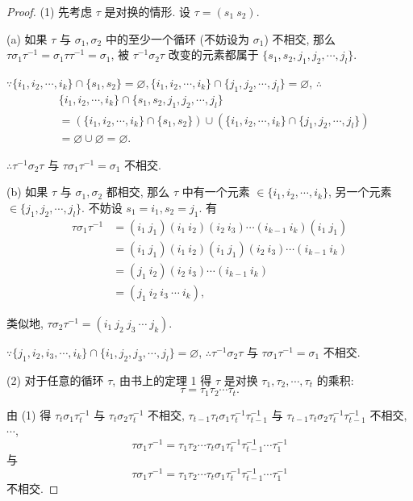 \documentclass[color=black,device=normal,lang=cn,mode=geye]{elegantnote}
\begin{document}
\begin{proof}
    (1) 先考虑 $\tau$ 是对换的情形. 设 $\tau=(s_1\ s_2)$.
    
    (a) 如果 $\tau$ 与 $\sigma_1,\sigma_2$ 中的至少一个循环 (不妨设为 $\sigma_1$) 不相交, 那么 $\tau\sigma_1\tau^{-1}=\sigma_1\tau\tau^{-1}=\sigma_1$, 被 $\tau^{-1}\sigma_2\tau$ 改变的元素都属于 $\{s_1,s_2,j_1,j_2,\cdots,j_l\}$.
    
    $\because\{i_1,i_2,\cdots,i_k\}\cap\{s_1,s_2\}=\varnothing,\{i_1,i_2,\cdots,i_k\}\cap\{j_1,j_2,\cdots,j_l\}=\varnothing$, $\therefore$
    \begin{align*}
        & \{i_1,i_2,\cdots,i_k\}\cap\{s_1,s_2,j_1,j_2,\cdots,j_l\} \\
        & =(\{i_1,i_2,\cdots,i_k\}\cap\{s_1,s_2\})\cup(\{i_1,i_2,\cdots,i_k\}\cap\{j_1,j_2,\cdots,j_l\}) \\
        & =\varnothing\cup\varnothing=\varnothing.
    \end{align*}

    $\therefore\tau^{-1}\sigma_2\tau$ 与 $\tau\sigma_1\tau^{-1}=\sigma_1$ 不相交.

    (b) 如果 $\tau$ 与 $\sigma_1,\sigma_2$ 都相交, 那么 $\tau$ 中有一个元素 $\in\{i_1,i_2,\cdots,i_k\}$, 另一个元素 $\in\{j_1,j_2,\cdots,j_l\}$. 不妨设 $s_1=i_1,s_2=j_1$. 有
    \begin{align*}
        \tau\sigma_1\tau^{-1} & =(i_1\ j_1)(i_1\ i_2)(i_2\ i_3)\cdots(i_{k-1}\ i_k)(i_1\ j_1) \\
        & =(i_1\ j_1)(i_1\ i_2)(i_1\ j_1)(i_2\ i_3)\cdots(i_{k-1}\ i_k) \\
        & =(j_1\ i_2)(i_2\ i_3)\cdots(i_{k-1}\ i_k) \\
        & =(j_1\ i_2\ i_3\ \cdots\ i_k),
    \end{align*}

    类似地, $\tau\sigma_2\tau^{-1}=(i_1\ j_2\ j_3\ \cdots\ j_k)$.
    
    $\because\{j_1,i_2,i_3,\cdots,i_k\}\cap\{i_1,j_2,j_3,\cdots,j_l\}=\varnothing$, $\therefore\tau^{-1}\sigma_2\tau$ 与 $\tau\sigma_1\tau^{-1}=\sigma_1$ 不相交.

    (2) 对于任意的循环 $\tau$, 由书上的定理 1 得 $\tau$ 是对换 $\tau_1,\tau_2,\cdots,\tau_t$ 的乘积:
    \[\tau=\tau_1\tau_2\cdots\tau_t.\]

    由 (1) 得 $\tau_t\sigma_1\tau_t^{-1}$ 与 $\tau_t\sigma_2\tau_t^{-1}$ 不相交, $\tau_{t-1}\tau_t\sigma_1\tau_t^{-1}\tau_{t-1}^{-1}$ 与 $\tau_{t-1}\tau_t\sigma_2\tau_t^{-1}\tau_{t-1}^{-1}$ 不相交, $\cdots$,
    \[\tau\sigma_1\tau^{-1}=\tau_1\tau_2\cdots\tau_t\sigma_1\tau_t^{-1}\tau_{t-1}^{-1}\cdots\tau_1^{-1}\]
    与
    \[\tau\sigma_1\tau^{-1}=\tau_1\tau_2\cdots\tau_t\sigma_1\tau_t^{-1}\tau_{t-1}^{-1}\cdots\tau_1^{-1}\]
    不相交.
\end{proof}
\end{document}
